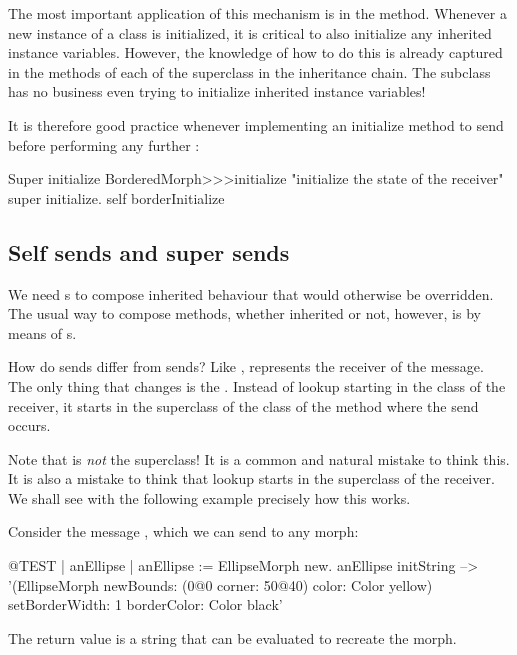 \documentclass[a4paper,10pt,twoside]{book}
\begin{document}
The most important application of this mechanism is in the  method.
Whenever a new instance of a class is initialized, it is critical to also initialize any inherited instance variables.
However, the knowledge of how to do this is already captured in the  methods of each of the superclass in the inheritance chain.
The subclass has no business even trying to initialize inherited instance variables!

It is therefore good practice whenever implementing an initialize method to send  before performing any further :

\begin{method}[morphinit]{Super initialize}
BorderedMorph>>>initialize
	"initialize the state of the receiver"
	super initialize.
	self borderInitialize
\end{method}


\subsection{Self sends and super sends}

We need \super {}s to compose inherited behaviour that would otherwise be overridden.
The usual way to compose methods, whether inherited or not, however, is by means of \self {}s.

How do \self sends differ from \super sends?
Like \self, \super represents the receiver of the message.
The only thing that changes is the .
Instead of lookup starting in the class of the receiver, it starts in the superclass of the class of the method where the \super send occurs.

Note that \super is \emph{not} the superclass!
It is a common and natural mistake to think this.
It is also a mistake to think that lookup starts in the superclass of the receiver.
We shall see with the following example precisely how this works.

Consider the message , which we can send to any morph:
\begin{code}{@TEST | anEllipse | anEllipse := EllipseMorph new.}
anEllipse initString --> '(EllipseMorph newBounds: (0@0 corner: 50@40) color: Color yellow) setBorderWidth: 1 borderColor: Color black'
\end{code}
The return value is a string that can be evaluated to recreate the morph.
\end{document}
